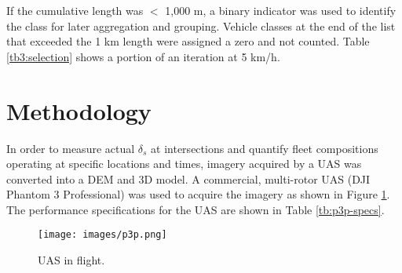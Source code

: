 If the cumulative length was $<$ 1,000 m, a binary indicator was used to identify the class for later aggregation and grouping.  Vehicle classes at the end of the list that exceeded the 1 km length were assigned a zero and not counted.  Table \ref{tb3:selection} shows a portion of an iteration at 5 km/h. 

\begin{table}[H]
\centering
\caption[Vehicle density sample]{Sample of an iteration showing vehicle class and road space selection for speed = 5 km/h.}
\label{tb3:selection}
\end{table}

\section{Methodology}

In order to measure actual $\delta_{s}$ at intersections and quantify fleet compositions operating at specific locations and times, imagery acquired by a UAS was converted into a DEM and 3D model. A commercial, multi-rotor UAS (DJI Phantom 3 Professional) was used to acquire the imagery as shown in Figure \ref{fig:p3p}. The performance specifications for the UAS are shown in Table \ref{tb:p3p-specs}.

%
\begin{figure}[H]
\centering
\texttt{[image: images/p3p.png]}  %
\caption{UAS in flight.}
\label{fig:p3p}
\end{figure}
%

